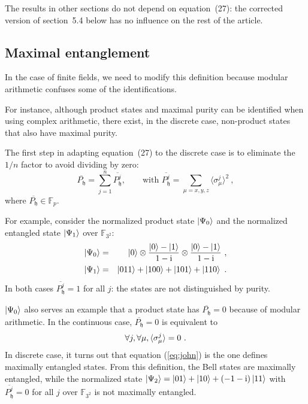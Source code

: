 \documentclass{iopart}
\newcommand{\ComplexI}{\text{i}}
\newcommand{\ff}[1]{\mathbb{F}_{#1}}
\def\fh{\mathfrak{h}}
\begin{document}
\bigskip The results in other sections do not depend on equation~(27): the corrected version of section~5.4 below has no influence on the rest of the article. 

\subsection{Maximal entanglement}


In the case of finite fields, we need to modify this definition because modular arithmetic confuses some of the identifications. 



For instance, although product states and maximal purity can be identified when using complex arithmetic, there exist, in the discrete case, non-product states that also have maximal purity. 

The first step in adapting equation~(27) to the discrete case is to eliminate the $1/n$ factor to avoid dividing by zero: 
\begin{equation}
\overline{P_{\fh}}=\sum\limits _{j=1}^{n}\overline{P_{\fh}^{j}}, \qquad\mbox{with~}
\overline{P_{\fh}^j} = \sum\limits _{\mu=x,y,z}\langle\sigma_{\mu}^{j}\rangle^{2}\ ,
\end{equation}
where $\overline{P_{\fh}}\in\ff{p}$. 

For example, consider the normalized product state $\ket{\Psi_{0}}$ and the normalized entangled 
state $\ket{\Psi_{1}}$ over $\ff{3^{2}}$: 
\begin{eqnarray}
\ket{\Psi_{0}} & = & \ket{0}\otimes\frac{\ket{0}-\ket{1}}{1-\ComplexI}\otimes\frac{\ket{0}-\ket{1}}{1-\ComplexI}\ ,\\
\ket{\Psi_{1}} & = & \ket{011}+\ket{100}+\ket{101}+\ket{110}\ .
\end{eqnarray}
In both cases $\overline{P_{\fh}^j} = 1$ for all $j$: the states are not distinguished by purity. 

$\ket{\Psi_{0}}$ also serves an example that a product state has
$\overline{P_{\fh}}=0$ because of modular arithmetic. In the continuous
case, $\overline{P_{\fh}}=0$ is equivalent to 
\begin{equation}
\forall j,\forall\mu,\braket{\sigma_{\mu}^{j}}=0\ .\label{eq:john}
\end{equation}
In discrete case, it turns out that equation (\ref{eq:john}) is the
one defines maximally entangled states. From this definition, the
Bell states are maximally entangled, while the normalized state $\ket{\Psi_{2}}=\ket{01}+\ket{10}+\left(-1-\ComplexI\right)\ket{11}$
with $\overline{P_{\fh}^{j}}=0$ for all $j$ over $\ff{3^{2}}$ is
not maximally entangled.
\end{document}
